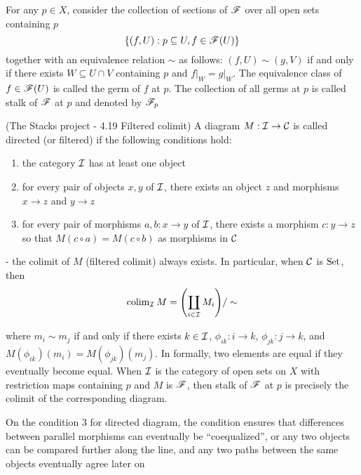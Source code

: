 \begin{definition}
	For any $p \in X$, consider the collection of sections of $\mathscr{F}$ over all open sets containing $p$
	$$
		\{(f, U): p \subseteq U, f \in \mathscr{F}(U)\}
	$$
	together with an equivalence relation $\sim$ as follows: $(f, U) \sim (g, V)$ if and only if there exists $W \subseteq U \cap V$ containing $p$ and $f\vert_W = g\vert_W$. The equivalence class of $f \in \mathscr{F}(U)$ is called the germ of $f$ at $p$. The collection of all germs at $p$ is called stalk of $\mathscr{F}$ at $p$ and denoted by $\mathscr{F}_p$
\end{definition}

\begin{remark}
	(The Stacks project - 4.19 Filtered colimit) A diagram $M: \mathcal{I} \to \mathcal{C}$ is called directed (or filtered) if the following conditions hold:
	\begin{enumerate}
		\item the category $\mathcal{I}$ has at least one object
		\item for every pair of objects $x, y$ of $\mathcal{I}$, there exists an object $z$ and morphisms $x \to z$ and $y \to z$
		\item for every pair of morphisms $a, b: x \to y$ of $\mathcal{I}$, there exists a morphism $c: y \to z$ so that $M(c \circ a) = M(c \circ b)$ as morphisms in $\mathcal{C}$ 
	\end{enumerate}
	
	 - the colimit of $M$ (filtered colimit) always exists. In particular, when $\mathcal{C}$ is $\operatorname{Set}$, then
	$$
		\colim_{\mc{I}} M = \tuple*{\coprod_{i \in \mc{I}} M_i} / \sim
	$$
	
	where $m_i \sim m_j$ if and only if there exists $k \in \mathcal{I}$, $\phi_{ik}: i \to k$, $\phi_{jk}: j \to k$, and $M(\phi_{ik})(m_i) = M(\phi_{jk})(m_j)$. In formally, two elements are equal if they eventually become equal. When $\mathcal{I}$ is the category of open sets on $X$ with restriction maps containing $p$ and $M$ is $\mathscr{F}$, then stalk of $\mathscr{F}$ at $p$ is precisely the colimit of the corresponding diagram.
\end{remark}

\begin{remark}
	On the condition 3 for directed diagram, the condition ensures that differences between parallel morphisms can eventually be “coequalized”, or any two objects can be compared further along the line, and any two paths between the same objects eventually agree later on
\end{remark}

